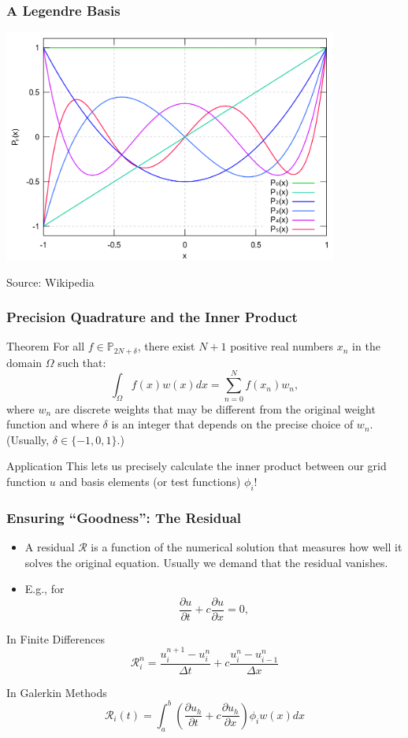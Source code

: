 \documentclass[]{beamer}
\newcommand{\pd}[2]{\frac{\partial #1}{\partial #2}}
\begin{document}
\begin{frame}
  \frametitle{A Legendre Basis}
  \begin{center}
    \vspace{-0.5cm}
    \includegraphics[width=11cm]{Legendrepolynomials6.png}
  \end{center}
  \vspace{-0.5cm}
  Source: Wikipedia
\end{frame}

\begin{frame}
  \frametitle{Precision Quadrature and the Inner Product}
  \begin{block}{Theorem}
    For all $f\in\mathbb{P}_{2N + \delta}$, there exist $N+1$ positive
    real numbers $x_n$ in the domain $\Omega$ such that:
    $$\int_\Omega f(x) w(x) dx = \sum_{n=0}^Nf(x_n) w_n,$$
    where $w_n$ are discrete weights that may be different from the
    original weight function and where $\delta$ is an integer that
    depends on the precise choice of $w_n$. (Usually, $\delta\in\{-1,0,1\}$.)
  \end{block}
  \pause
  \begin{block}{Application}
    This lets us precisely calculate the inner product between our
    grid function $u$ and basis elements (or test functions)
    $\phi_i$!
  \end{block}
\end{frame}

\begin{frame}
  \frametitle{Ensuring ``Goodness'': The Residual}
  \begin{itemize}
  \item A residual $\mathcal{R}$ is a function of the numerical
    solution that measures how well it solves the original
    equation. Usually we demand that the residual vanishes.
    \item E.g., for 
      $$\pd{u}{t} + c \pd{u}{x}=0,$$
  \end{itemize}  
  \begin{block}{In Finite Differences}
    $$ \mathcal{R}_i^n = \frac{u_i^{n+1} - u_{i}^n}{\Delta t} + c \frac{u_{i}^n - u_{i-1}^n}{\Delta x}$$
  \end{block}
  \begin{block}{In Galerkin Methods}
    $$\mathcal{R}_i(t) = \int_a^b \left(\pd{u_h}{t} + c \pd{u_h}{x}\right)\phi_i w(x) dx$$
  \end{block}
\end{frame}
\end{document}
